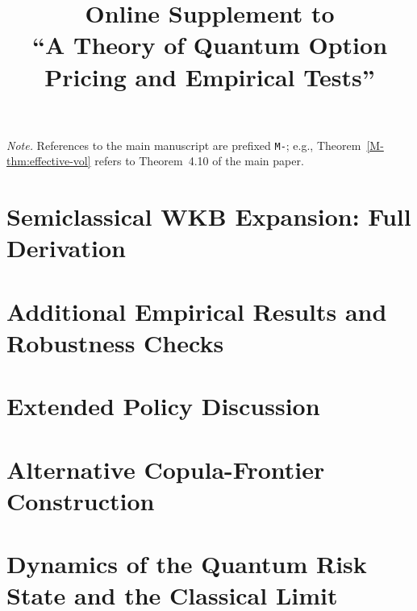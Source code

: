 \documentclass[11pt,letterpaper]{article}
\title{Online Supplement to\\
       ``A Theory of Quantum Option Pricing and Empirical Tests''}
\author{}
\date{}
\theoremstyle{plain}
\theoremstyle{definition}
\begin{document}
\maketitle

\makeatletter
\renewcommand*\l@section{\@dottedtocline{1}{0em}{3.6em}}
\renewcommand*\l@subsection{\@dottedtocline{2}{3.6em}{3.6em}}
\makeatother

\tableofcontents
\bigskip
\noindent\textit{Note.} References to the main manuscript are prefixed
\texttt{M-}; e.g., Theorem~\ref{M-thm:effective-vol} refers to
Theorem~4.10 of the main paper.
\clearpage

\section{Semiclassical WKB Expansion: Full Derivation}
\label{sec:S1}


\section{Additional Empirical Results and Robustness Checks}
\label{sec:S2}


\section{Extended Policy Discussion}
\label{sec:S3}


\section{Alternative Copula-Frontier Construction}
\label{sec:S5}


\section{Dynamics of the Quantum Risk State and the Classical Limit}
\label{sec:S6}

\end{document}
